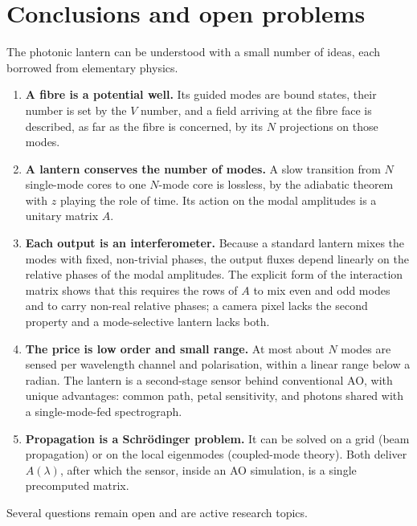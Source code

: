 \documentclass[11pt,a4paper]{article}
\begin{document}
\section{Conclusions and open problems}
The photonic lantern can be understood with a small number of ideas, each borrowed from elementary physics.
\begin{enumerate}
\item \textbf{A fibre is a potential well.} Its guided modes are bound states, their number is set by the $V$ number, and a field arriving at the fibre face is described, as far as the fibre is concerned, by its $N$ projections on those modes.
\item \textbf{A lantern conserves the number of modes.} A slow transition from $N$ single-mode cores to one $N$-mode core is lossless, by the adiabatic theorem with $z$ playing the role of time. Its action on the modal amplitudes is a unitary matrix $A$.
\item \textbf{Each output is an interferometer.} Because a standard lantern mixes the modes with fixed, non-trivial phases, the output fluxes depend linearly on the relative phases of the modal amplitudes. The explicit form of the interaction matrix shows that this requires the rows of $A$ to mix even and odd modes and to carry non-real relative phases; a camera pixel lacks the second property and a mode-selective lantern lacks both.
\item \textbf{The price is low order and small range.} At most about $N$ modes are sensed per wavelength channel and polarisation, within a linear range below a radian. The lantern is a second-stage sensor behind conventional AO, with unique advantages: common path, petal sensitivity, and photons shared with a single-mode-fed spectrograph.
\item \textbf{Propagation is a Schr\"odinger problem.} It can be solved on a grid (beam propagation) or on the local eigenmodes (coupled-mode theory). Both deliver $A(\lambda)$, after which the sensor, inside an AO simulation, is a single precomputed matrix.
\end{enumerate}
Several questions remain open and are active research topics.
\end{document}
